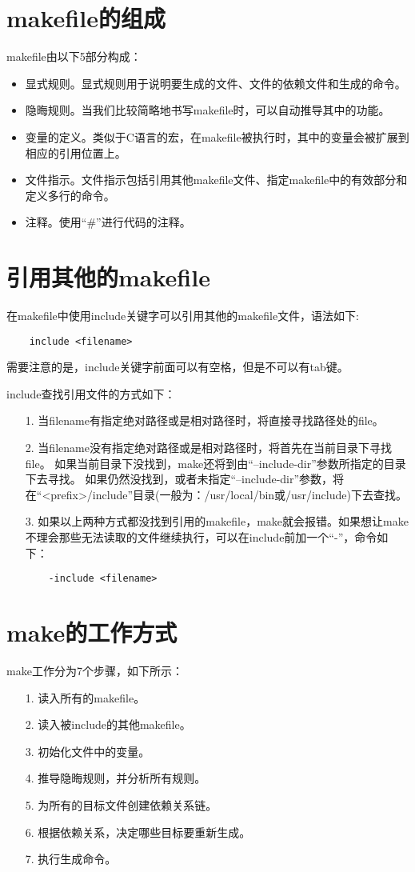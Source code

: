 \documentclass[a4paper,left=2.5cm,right=2.5cm,11pt]{article}
\begin{document}
\tableofcontents

\clearpage

\section{makefile的组成}
	makefile由以下5部分构成：
	\begin{itemize}
		\item 显式规则。显式规则用于说明要生成的文件、文件的依赖文件和生成的命令。
		\item 隐晦规则。当我们比较简略地书写makefile时，可以自动推导其中的功能。
		\item 变量的定义。类似于C语言的宏，在makefile被执行时，其中的变量会被扩展到相应的引用位置上。
		\item 文件指示。文件指示包括引用其他makefile文件、指定makefile中的有效部分和定义多行的命令。
		\item 注释。使用“\#”进行代码的注释。
	\end{itemize}

\section{引用其他的makefile}
	在makefile中使用include关键字可以引用其他的makefile文件，语法如下:
	\begin{lstlisting}
	include <filename>
	\end{lstlisting}

	需要注意的是，include关键字前面可以有空格，但是不可以有tab键。\par

	include查找引用文件的方式如下：
	\begin{itemize}
		\item[1.] 当filename有指定绝对路径或是相对路径时，将直接寻找路径处的file。
		\item[2.] 当filename没有指定绝对路径或是相对路径时，将首先在当前目录下寻找file。
				  如果当前目录下没找到，make还将到由“--include-dir”参数所指定的目录下去寻找。
				  如果仍然没找到，或者未指定“--include-dir”参数，将在“<prefix>/include”目录(一般为：/usr/local/bin或/usr/include)下去查找。
		\item[3.] 如果以上两种方式都没找到引用的makefile，make就会报错。如果想让make不理会那些无法读取的文件继续执行，可以在include前加一个“-”，命令如下：
		\begin{lstlisting}
	-include <filename>
		\end{lstlisting}
	\end{itemize}

\section{make的工作方式}
	make工作分为7个步骤，如下所示：
	\begin{itemize}
		\item[1.] 读入所有的makefile。
		\item[2.] 读入被include的其他makefile。
		\item[3.] 初始化文件中的变量。
		\item[4.] 推导隐晦规则，并分析所有规则。
		\item[5.] 为所有的目标文件创建依赖关系链。
		\item[6.] 根据依赖关系，决定哪些目标要重新生成。
		\item[7.] 执行生成命令。
	\end{itemize}
\end{document}
